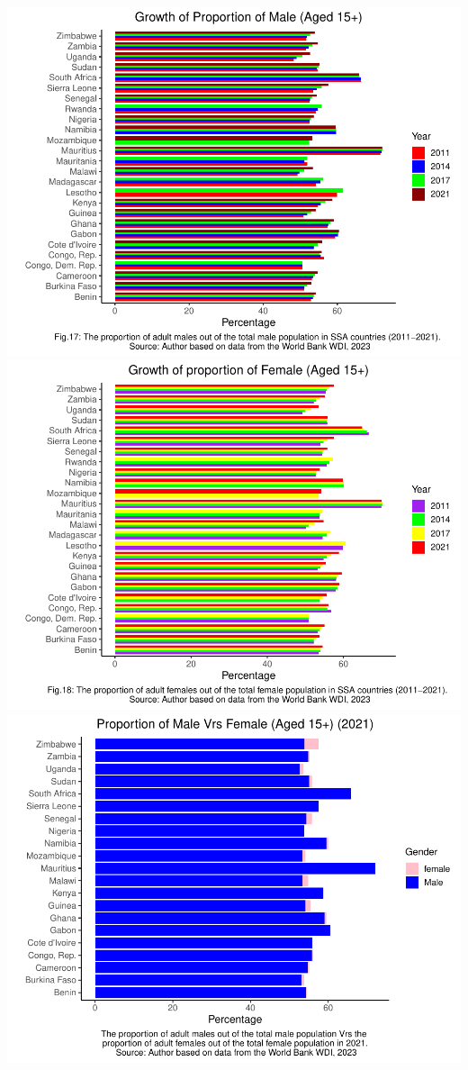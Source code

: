 \documentclass[preprint, 3p,
authoryear]{elsarticle} %
\begin{document}
\includegraphics{504.Project1_files/figure-latex/unnamed-chunk-9-1.pdf}
\includegraphics{504.Project1_files/figure-latex/unnamed-chunk-9-2.pdf}
\includegraphics{504.Project1_files/figure-latex/unnamed-chunk-9-3.pdf}
\end{document}
